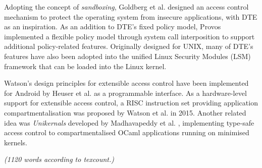 \documentclass[11pt]{article}
\begin{document}
Adopting the concept of \emph{sandboxing}, Goldberg et al. \cite{goldberg1996secure} designed an access control mechanism to  protect the operating system from insecure applications, with DTE \cite{badger1996domain} as an inspiration. As an addition to DTE's fixed policy model, Provos \cite{provos2003improving} implemented a flexible policy model through system call interposition to support additional policy-related features. Originally designed for UNIX, many of DTE's features have also been adopted into the unified Linux Security Modules (LSM) framework \cite{morris2002linux} that can be loaded into the Linux kernel.

Watson's design principles for extensible access control \cite[p. 53]{watson2013decade} have been implemented for Android by Heuser et al. \cite{heuser2014asm} as a programmable interface. As a hardware-level support for extensible access control, a RISC instruction set providing application compartmentalisation was proposed by Watson et al. \cite{watson2015cheri} in 2015. Another related idea was \emph{Unikernals} developed by Madhavapeddy et al. \cite{madhavapeddy2013unikernels}, implementing type-safe access control to compartmentalised OCaml applications running on minimised kernels.

\emph{(1120 words according to texcount.)}


\footnotesize{}
\end{document}
